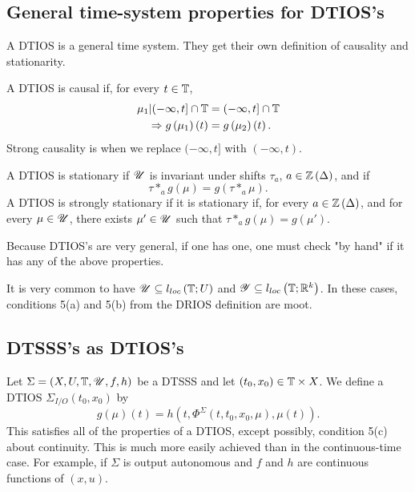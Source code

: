 
\subsection{General time-system properties for DTIOS's}

A DTIOS is a general time system. They get their own definition of causality and stationarity. 

\begin{definition}
	A DTIOS is causal if, for every $t \in  \mathbb{T} $, 
	\begin{align*}
		\mu_{1} | (-\infty, t] \cap \mathbb{T} &=  (-\infty, t] \cap \mathbb{T}  \\
		\Rightarrow g\left( \mu_1 \right) \left( t \right) &= g\left( \mu_2 \right) \left( t \right) 
	.\end{align*}
	Strong causality is when we replace $(-\infty, t]$ with $\left( -\infty, t \right) $.
\end{definition}

\begin{definition}
	A DTIOS is stationary if $\mathscr{U}$ is invariant under shifts $\tau_{a}$, $a \in  \mathbb{Z}\left( \Delta \right) $, and if 
	 \[
		 \tau*_{a}g\left( \mu \right) = g\left( \tau*_{a}\mu \right) 
	.\] 
	A DTIOS is strongly stationary if it is stationary if, for every $a \in  \mathbb{Z}\left( \Delta \right) $, and for every $\mu \in \mathscr{U}$, there exists  $\mu' \in  \mathscr{U}$ such that $\tau*_{a} g\left( \mu \right) = g\left( \mu' \right) $. 
\end{definition}

	Because DTIOS's are very general, if one has one, one must check "by hand" if it has any of the above properties.

	\begin{note}
		It is very common to have $\mathscr{U} \subseteq l_{loc}\left( \mathbb{T} ; U \right) $ and $\mathscr{Y} \subseteq l_{loc}\left( \mathbb{T} ; \mathbb{R} ^{k} \right) $. In these cases, conditions 5(a) and 5(b) from the DRIOS definition are moot. 
	\end{note}

	\subsection{DTSSS's as DTIOS's}

	Let $\Sigma = \left( X, U, \mathbb{T} , \mathscr{U}, f, h \right) $ be a DTSSS and let $\left( t_0, x_0 \right) \in \mathbb{T}  \times  X$. We define a DTIOS $\Sigma _{I / O}\left( t_0, x_0 \right) $ by 
	\[
		g\left( \mu \right) \left( t \right) = h\left( t, \Phi^{\Sigma}\left( t, t_0, x_0, \mu \right) , \mu\left( t \right)   \right) 
	.\] 
	This satisfies all of the properties of a DTIOS, except possibly, condition 5(c) about continuity. This is much more easily achieved than in the continuous-time case. For example, if $\Sigma $ is output autonomous and $f$ and $h$ are continuous functions of  $\left( x, u \right) $. 
